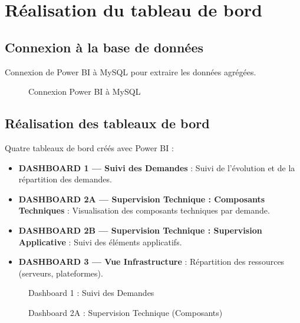 \section{Réalisation du tableau de bord}

\subsection{Connexion à la base de données}

Connexion de Power BI à MySQL pour extraire les données agrégées.

\begin{figure}[h]
    \centering
    \caption{Connexion Power BI à MySQL}
    \label{fig:powerbi_connection}
\end{figure}

\subsection{Réalisation des tableaux de bord}

Quatre tableaux de bord créés avec Power BI :

\begin{itemize}
    \item \textbf{DASHBOARD 1 — Suivi des Demandes} : Suivi de l’évolution et de la répartition des demandes.
    \item \textbf{DASHBOARD 2A — Supervision Technique : Composants Techniques} : Visualisation des composants techniques par demande.
    \item \textbf{DASHBOARD 2B — Supervision Technique : Supervision Applicative} : Suivi des éléments applicatifs.
    \item \textbf{DASHBOARD 3 — Vue Infrastructure} : Répartition des ressources (serveurs, plateformes).
\end{itemize}

\begin{figure}[h]
    \centering
    \caption{Dashboard 1 : Suivi des Demandes}
    \label{fig:dashboard1}
\end{figure}

\begin{figure}[h]
    \centering
    \caption{Dashboard 2A : Supervision Technique (Composants)}
    \label{fig:dashboard2a}
\end{figure}

